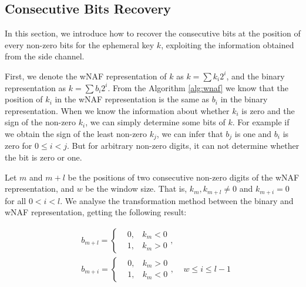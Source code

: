 






\subsection{Consecutive Bits Recovery}
\label{data_proc1}
In this section, we introduce how to recover the consecutive bits at the position of every non-zero bits for the ephemeral key $k$, exploiting the information obtained from the side channel.

First, we denote the wNAF representation of $k$ as $k = \sum{k_{i}2^{i}}$,
 and the binary representation as $k = \sum{b_{i}2^{i}}$.
From the Algorithm \ref{alg:wnaf} we know that the position of $k_i$ in the wNAF representation is the same as $b_i$ in the binary representation.
 When we know the information about whether $k_i$ is zero and the sign of the non-zero $k_i$, we can simply determine some bits of $k$.
 For example if we obtain the sign of the least non-zero $k_j$, we can infer that $b_j$ is one and $b_i$ is zero for $0\leq i<j$.
 But for arbitrary non-zero digits, it can not determine whether the bit is zero or one.

 Let $m$ and $m + l$ be the positions of two consecutive non-zero digits of the wNAF representation, and $w$ be the window size.
 That is, $k_m, k_{m+l} \neq 0$ and $k_{m+i} = 0$ for all $0 < i < l$.
 We analyse the transformation method between the binary and wNAF representation, getting the following result:

 \begin{align}
 &b_{m+l} = \left\{
 \begin{aligned}
 	&0,\,\;\ \   k_m < 0 \\
 	&1,\,\;\ \   k_m > 0
 \end{aligned}
 \right.  , \\
 &b_{m+i} = \left\{
 \begin{aligned}
 	&0,\,\;\ \   k_m > 0 \\
 	&1,\,\;\ \   k_m < 0
 \end{aligned}
 \right.
 ,\ \ \ \ \  w \leq i \leq l-1
 \end{align}

